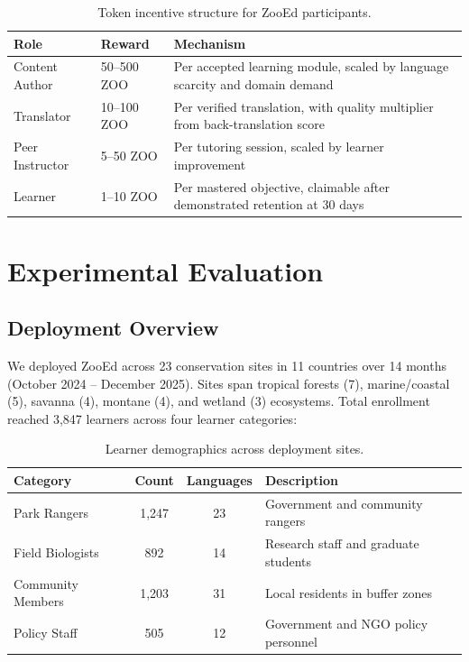 \documentclass[11pt,a4paper]{article}
\begin{document}
\begin{table}[H]
\centering
\caption{Token incentive structure for ZooEd participants.}
\label{tab:incentives}
\begin{tabularx}{\textwidth}{@{}llX@{}}
\toprule
\textbf{Role} & \textbf{Reward} & \textbf{Mechanism} \\
\midrule
Content Author & 50--500 ZOO & Per accepted learning module, scaled by language scarcity and domain demand \\
Translator & 10--100 ZOO & Per verified translation, with quality multiplier from back-translation score \\
Peer Instructor & 5--50 ZOO & Per tutoring session, scaled by learner improvement \\
Learner & 1--10 ZOO & Per mastered objective, claimable after demonstrated retention at 30 days \\
\bottomrule
\end{tabularx}
\end{table}

\section{Experimental Evaluation}
\label{sec:evaluation}

\subsection{Deployment Overview}

We deployed ZooEd across 23 conservation sites in 11 countries over 14 months (October 2024 -- December 2025).
Sites span tropical forests (7), marine/coastal (5), savanna (4), montane (4), and wetland (3) ecosystems.
Total enrollment reached 3,847 learners across four learner categories:

\begin{table}[H]
\centering
\caption{Learner demographics across deployment sites.}
\label{tab:demographics}
\begin{tabularx}{\textwidth}{@{}lccX@{}}
\toprule
\textbf{Category} & \textbf{Count} & \textbf{Languages} & \textbf{Description} \\
\midrule
Park Rangers & 1,247 & 23 & Government and community rangers \\
Field Biologists & 892 & 14 & Research staff and graduate students \\
Community Members & 1,203 & 31 & Local residents in buffer zones \\
Policy Staff & 505 & 12 & Government and NGO policy personnel \\
\bottomrule
\end{tabularx}
\end{table}
\end{document}
